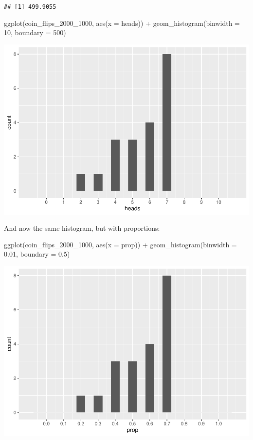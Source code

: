\documentclass[
]{book}
\newenvironment{Shaded}{\begin{snugshade}}{\end{snugshade}}
\newcommand{\AttributeTok}[1]{\textcolor[rgb]{0.77,0.63,0.00}{#1}}
\newcommand{\DecValTok}[1]{\textcolor[rgb]{0.00,0.00,0.81}{#1}}
\newcommand{\FloatTok}[1]{\textcolor[rgb]{0.00,0.00,0.81}{#1}}
\newcommand{\FunctionTok}[1]{\textcolor[rgb]{0.00,0.00,0.00}{#1}}
\newcommand{\NormalTok}[1]{#1}
\newcommand{\SpecialCharTok}[1]{\textcolor[rgb]{0.00,0.00,0.00}{#1}}
\begin{document}
\begin{verbatim}
## [1] 499.9055
\end{verbatim}

\begin{Shaded}
\begin{Highlighting}[]
\FunctionTok{ggplot}\NormalTok{(coin\_flips\_2000\_1000, }\FunctionTok{aes}\NormalTok{(}\AttributeTok{x =}\NormalTok{ heads)) }\SpecialCharTok{+}
    \FunctionTok{geom\_histogram}\NormalTok{(}\AttributeTok{binwidth =} \DecValTok{10}\NormalTok{, }\AttributeTok{boundary =} \DecValTok{500}\NormalTok{)}
\end{Highlighting}
\end{Shaded}

\includegraphics{intro_stats_files/figure-latex/unnamed-chunk-224-1.pdf}

And now the same histogram, but with proportions:

\begin{Shaded}
\begin{Highlighting}[]
\FunctionTok{ggplot}\NormalTok{(coin\_flips\_2000\_1000, }\FunctionTok{aes}\NormalTok{(}\AttributeTok{x =}\NormalTok{ prop)) }\SpecialCharTok{+}
    \FunctionTok{geom\_histogram}\NormalTok{(}\AttributeTok{binwidth =} \FloatTok{0.01}\NormalTok{, }\AttributeTok{boundary =} \FloatTok{0.5}\NormalTok{)}
\end{Highlighting}
\end{Shaded}

\includegraphics{intro_stats_files/figure-latex/unnamed-chunk-225-1.pdf}
\end{document}
